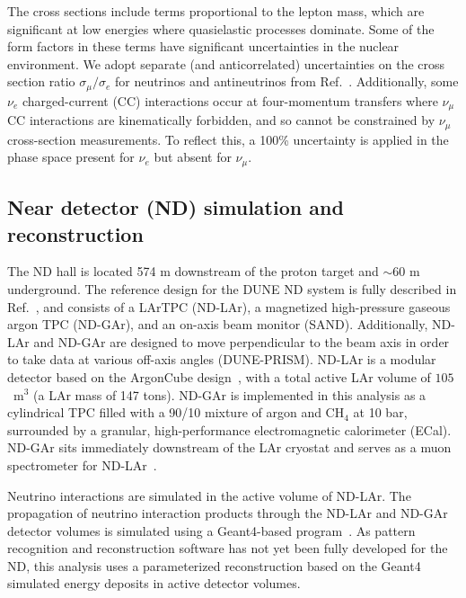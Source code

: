 The cross sections include terms proportional to the lepton mass, which are significant at low energies where quasielastic processes dominate. Some of the form factors in these terms have significant uncertainties in the nuclear environment. We adopt separate (and anticorrelated) uncertainties on the cross section ratio $\sigma_\mu/\sigma_e$ for neutrinos and antineutrinos from Ref.~\cite{Day:2012gb}. Additionally, some $\nu_e$ charged-current (CC) interactions occur at four-momentum transfers where $\nu_\mu$ CC interactions are kinematically forbidden, and so cannot be constrained by $\nu_\mu$ cross-section measurements. To reflect this, a 100\% uncertainty is applied in the phase space present for $\nu_e$ but absent for $\nu_\mu$.

\subsection{Near detector (ND) simulation and reconstruction}
The ND hall is located 574 m downstream of the proton target and $\sim$60 m underground. The reference design for the DUNE ND system is fully described in Ref.~\cite{AbedAbud:2021hpb}, and consists of a LArTPC (ND-LAr), a magnetized high-pressure gaseous argon TPC (ND-GAr), and an on-axis beam monitor (SAND). Additionally, ND-LAr and ND-GAr are designed to move perpendicular to the beam axis in order to take data at various off-axis angles (DUNE-PRISM). ND-LAr is a modular detector based on the ArgonCube design~\cite{argoncube_loi, Dwyer:2018phu, arclight}, with a total active LAr volume of $105$~m$^{3}$ (a LAr mass of 147 tons). ND-GAr is implemented in this analysis as a cylindrical TPC filled with a 90/10 mixture of argon and CH$_{4}$ at 10 bar, surrounded by a granular, high-performance electromagnetic calorimeter (ECal). ND-GAr sits immediately downstream of the LAr cryostat and serves as a muon spectrometer for ND-LAr~\cite{Emberger:2018pgr}.

Neutrino interactions are simulated in the active volume of ND-LAr. The propagation of neutrino interaction products through the ND-LAr and ND-GAr detector volumes is simulated using a Geant4-based program~\cite{Agostinelli:2002hh}. As pattern recognition and reconstruction software has not yet been fully developed for the ND, this analysis uses a parameterized reconstruction based on the Geant4 simulated energy deposits in active detector volumes.

